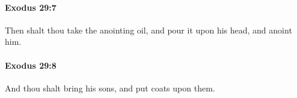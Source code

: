 		\paragraph{Exodus 29:7} %
			\label{EXODUS-29-7}

			Then shalt thou take the anointing oil, and pour it upon his head, and anoint him.


		\paragraph{Exodus 29:8} %
			\label{EXODUS-29-8}

			And thou shalt bring his sons, and put coats upon them.


